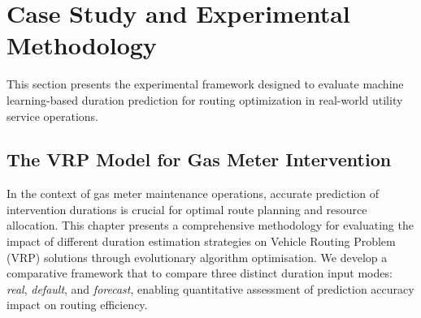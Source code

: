 \documentclass[preprint,12pt]{elsarticle}
\begin{document}

\section{Case Study and Experimental Methodology}
\label{sec:experimental}



This section presents the experimental framework designed to evaluate machine learning-based duration prediction for routing optimization in real-world utility service operations. 



\subsection{The VRP Model for Gas Meter Intervention}



In the context of gas meter maintenance operations, accurate prediction of intervention durations is crucial for optimal route planning and resource allocation. This chapter presents a comprehensive methodology for evaluating the impact of different duration estimation strategies on Vehicle Routing Problem (VRP) solutions through evolutionary algorithm optimisation. We develop a comparative framework that to compare three distinct duration input modes: \textit{real}, \textit{default}, and \textit{forecast}, enabling quantitative assessment of prediction accuracy impact on routing efficiency.
\end{document}
